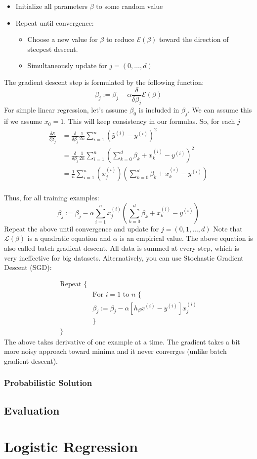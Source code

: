 \documentclass{report}
\begin{document}
\begin{itemize}
	\item Initialize all parameters \(\beta\) to some random value
	\item Repeat until convergence:
\begin{itemize}
	\item Choose a new value for \(\beta\) to reduce \(\mathcal{E}(\beta)\) toward the direction of steepest descent.
	\item Simultaneously update for \(j = (0, \dots, d)\)
\end{itemize}
\end{itemize}
The gradient descent step is formulated by the following function:
\[
	\beta_j := \beta_j - \alpha \frac{\delta}{\delta\beta_j}\mathcal{E}(\beta)
\]
For simple linear regression, let's assume \(\beta_0\) is included in \(\beta_j\). We can assume this if we assume \(x_0 = 1\). This will keep consistency in our formulas. So, for each \(j\) 
\begin{align*}
	\frac{\delta\mathcal{E}}{\delta\beta_j} &= \frac{\delta}{\delta\beta_j}\frac{1}{2n}\sum_{i=1}^n \left(\hat y^{(i)} - y^{(i)}\right)^2 \\
										  &= \frac{\delta}{\delta\beta_j}\frac{1}{2n}\sum_{i=1}^n \left(\sum_{k=0}^d\beta_k + x_k^{(i)} - y^{(i)}\right)^2 \\
										  &= \frac{1}{n}\sum_{i=1}^n (x_j^{(i)})\left(\sum_{k=0}^d\beta_k + x_k^{(i)} - y^{(i)}\right) \\
\end{align*}

Thus, for all training examples:
\[
	\beta_j := \beta_j - \alpha \sum_{i=1}^n x_j^{(i)}\left(\sum_{k=0}^d\beta_k + x_k^{(i)} - y^{(i)}\right)
\]
Repeat the above until convergence and update for \(j = (0,1,\dots,d)\)
Note that \(\mathcal{L}(\beta)\) is a quadratic equation and \(\alpha\) is an empirical value. The above equation is also called batch gradient descent. All data is summed at every step, which is very ineffective for big datasets. Alternatively, you can use Stochastic Gradient Descent (SGD): 

\begin{align*}
	\text{Repeat \{} \\
	&\text{For }i=1 \text{ to } n \text{ \{} \\
	&\beta_j := \beta_j - \alpha\left[h_\beta x^{(i)} - y^{(i)}\right]x_j^{(i)}\\
	&\text{\}} \\
	\text{\}}
\end{align*}
The above takes derivative of one example at a time. The gradient takes a bit more noisy approach toward minima and it never converges (unlike batch gradient descent).



\subsection{Probabilistic Solution}

\section{Evaluation}

\chapter{Logistic Regression}
\end{document}

